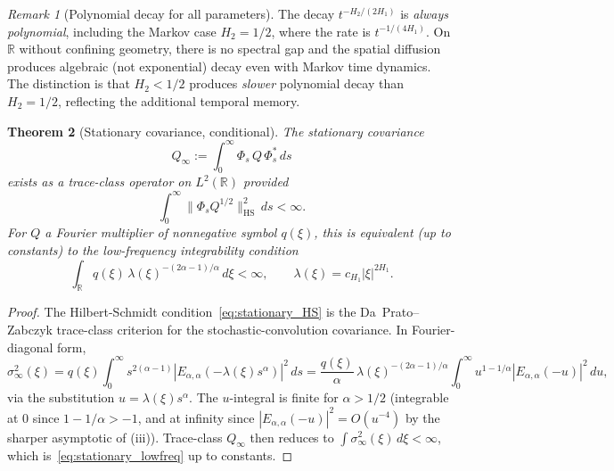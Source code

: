 \documentclass[11pt]{article}
\newtheorem{theorem}{Theorem}[section]
\theoremstyle{definition}
\theoremstyle{remark}
\newtheorem{remark}[theorem]{Remark}
\newcommand{\R}{\mathbb{R}}
\newcommand{\norm}[1]{\| #1 \|}
\begin{document}
\begin{remark}[Polynomial decay for all parameters]
The decay $t^{-H_2/(2H_1)}$ is \emph{always polynomial},
including the Markov case $H_2 = 1/2$, where the rate is
$t^{-1/(4H_1)}$.  On $\R$ without confining geometry,
there is no spectral gap and the spatial diffusion
produces algebraic (not exponential) decay even with
Markov time dynamics.  The distinction is that $H_2 < 1/2$
produces \emph{slower} polynomial decay than $H_2 = 1/2$,
reflecting the additional temporal memory.
\end{remark}

\begin{theorem}[Stationary covariance, conditional]
\label{thm:stationary}
The stationary covariance
\[
Q_\infty := \int_0^\infty \Phi_s\, Q\, \Phi_s^*\, ds
\]
exists as a trace-class operator on $L^2(\R)$ provided
\begin{equation}\label{eq:stationary_HS}
\int_0^\infty \norm{\Phi_s Q^{1/2}}_{\mathrm{HS}}^2\, ds
< \infty.
\end{equation}
For $Q$ a Fourier multiplier of nonnegative symbol
$q(\xi)$, this is equivalent (up to constants) to the
low-frequency integrability condition
\begin{equation}\label{eq:stationary_lowfreq}
\int_\R q(\xi)\, \lambda(\xi)^{-(2\alpha-1)/\alpha}\, d\xi
< \infty,
\qquad \lambda(\xi) = c_{H_1}|\xi|^{2H_1}.
\end{equation}
\end{theorem}

\begin{proof}
The Hilbert-Schmidt
condition~\eqref{eq:stationary_HS} is the Da~Prato--Zabczyk
trace-class criterion for the stochastic-convolution
covariance.  In Fourier-diagonal form,
\[
\sigma_\infty^2(\xi)
= q(\xi) \int_0^\infty s^{2(\alpha-1)}
|E_{\alpha,\alpha}(-\lambda(\xi) s^\alpha)|^2\, ds
= \frac{q(\xi)}{\alpha}\,
\lambda(\xi)^{-(2\alpha-1)/\alpha}
\int_0^\infty u^{1 - 1/\alpha}
|E_{\alpha,\alpha}(-u)|^2\, du,
\]
via the substitution $u = \lambda(\xi) s^\alpha$.  The
$u$-integral is finite for $\alpha > 1/2$ (integrable at
$0$ since $1 - 1/\alpha > -1$, and at infinity since
$|E_{\alpha,\alpha}(-u)|^2 = O(u^{-4})$ by the sharper
asymptotic of (iii)).  Trace-class
$Q_\infty$ then reduces to
$\int \sigma_\infty^2(\xi)\, d\xi
< \infty$, which is~\eqref{eq:stationary_lowfreq}
up to constants.
\end{proof}
\end{document}
